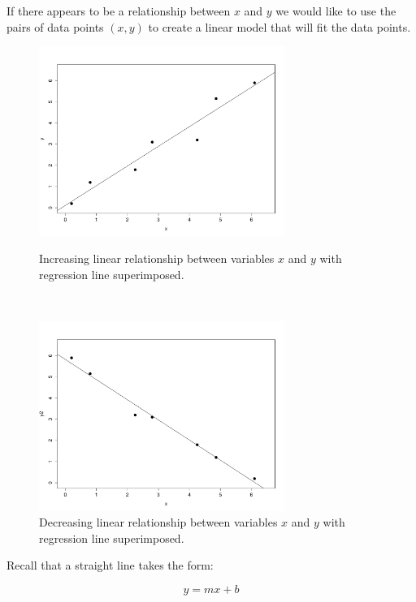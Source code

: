 If there appears to be a relationship between $x$ and $y$ 
we would like to use the pairs of data points $(x, y)$ to create 
a linear model that will fit the data points.


\begin{figure}[H]
\begin{minipage}[c]{0.48\textwidth}
	\includegraphics[width=8.0cm]{Section8/XandYplotIncreasingWithLine.pdf}
	\vspace{-0.25cm}
	\caption{Increasing linear relationship between variables $x$ and $y$
	with regression line superimposed.}
	\label{figureXandYincreasing}
\end{minipage}
~~
\begin{minipage}[c]{0.48\textwidth}
	\includegraphics[width=8.0cm]{Section8/XandYplotDecreasingWithLine.pdf}
	\vspace{-0.25cm}
	\caption{Decreasing linear relationship between variables $x$ and $y$
	with regression line superimposed.}
	\label{figureXandYdecreasing}
\end{minipage}
\end{figure}
\hfill


Recall that a straight line takes the form:

\begin{equation}
\label{equationStraightLine}
	y = mx + b
\end{equation}
\hfill

